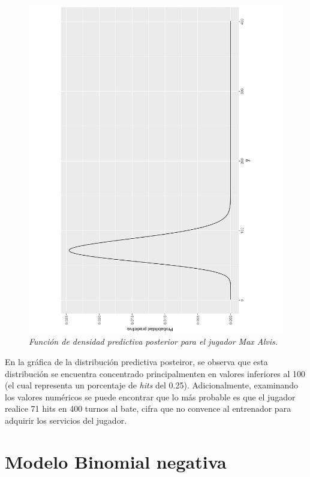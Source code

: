 \documentclass[10pt,openright]{book}\usepackage[]{graphicx}\usepackage[]{color}
\begin{document}
\begin{Eje}
    \begin{figure}[!h]
    \centering
    \includegraphics[scale=0.5,angle =-90 ]{predbinomial.pdf}
    \caption{\emph{Funci\'on de densidad predictiva posterior para el jugador Max Alvis.}}
    \label{PredBinom}
    \end{figure}
    
En la gr\'afica de la distribuci\'on predictiva posteiror, se observa que esta distribuci\'on se encuentra concentrado principalmenten en valores inferiores al 100 (el cual representa un porcentaje de \emph{hits} del 0.25). Adicionalmente, examinando los valores num\'ericos se puede encontrar que lo m\'as probable es que el jugador realice 71 hits en 400 turnos al bate, cifra que no convence al entrenador para adquirir los servicios del jugador.
    \end{Eje}
    
    \section{Modelo Binomial negativa}
    
\end{document}
